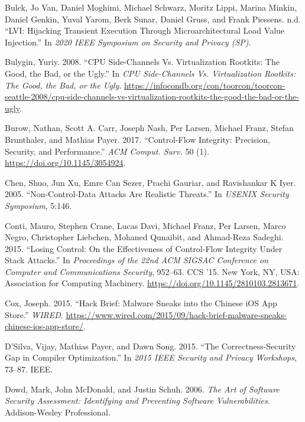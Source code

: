 \documentclass[
  a4paper,
]{report}
\newlength{\cslhangindent}
\newlength{\cslentryspacingunit} %
\newenvironment{CSLReferences}[2] %
 {%
  \setlength{\parindent}{0pt}
  \ifodd #1
  \let\oldpar\par
  \def\par{\hangindent=\cslhangindent\oldpar}
  \fi
  \setlength{\parskip}{#2\cslentryspacingunit}
 }%
 {}
\begin{document}
\begin{CSLReferences}{1}{0}
\leavevmode{}%
Bulck, Jo Van, Daniel Moghimi, Michael Schwarz, Moritz Lippi, Marina
Minkin, Daniel Genkin, Yuval Yarom, Berk Sunar, Daniel Gruss, and Frank
Piessens. n.d. {``{LVI}: Hijacking Transient Execution Through
Microarchitectural Load Value Injection.''} In \emph{2020 {IEEE}
Symposium on Security and Privacy ({SP})}.

\leavevmode{}%
Bulygin, Yuriy. 2008. {``{CPU} Side-Channels Vs. Virtualization
Rootkits: The Good, the Bad, or the Ugly.''} In \emph{CPU Side-Channels
Vs. Virtualization Rootkits: The Good, the Bad, or the Ugly}.
\url{https://infocondb.org/con/toorcon/toorcon-seattle-2008/cpu-side-channels-vs-virtualization-rootkits-the-good-the-bad-or-the-ugly}.

\leavevmode{}%
Burow, Nathan, Scott A. Carr, Joseph Nash, Per Larsen, Michael Franz,
Stefan Brunthaler, and Mathias Payer. 2017. {``Control-Flow Integrity:
Precision, Security, and Performance.''} \emph{ACM Comput. Surv.} 50
(1). \url{https://doi.org/10.1145/3054924}.

\leavevmode{}%
Chen, Shuo, Jun Xu, Emre Can Sezer, Prachi Gauriar, and Ravishankar K
Iyer. 2005. {``Non-Control-Data Attacks Are Realistic Threats.''} In
\emph{USENIX Security Symposium}, 5:146.

\leavevmode{}%
Conti, Mauro, Stephen Crane, Lucas Davi, Michael Franz, Per Larsen,
Marco Negro, Christopher Liebchen, Mohaned Qunaibit, and Ahmad-Reza
Sadeghi. 2015. {``Losing Control: On the Effectiveness of Control-Flow
Integrity Under Stack Attacks.''} In \emph{Proceedings of the 22nd ACM
SIGSAC Conference on Computer and Communications Security}, 952--63. CCS
'15. New York, NY, USA: Association for Computing Machinery.
\url{https://doi.org/10.1145/2810103.2813671}.

\leavevmode{}%
Cox, Joseph. 2015. {``Hack Brief: Malware Sneaks into the Chinese iOS
App Store.''} \emph{WIRED}.
\url{https://www.wired.com/2015/09/hack-brief-malware-sneaks-chinese-ios-app-store/}.

\leavevmode{}%
D'Silva, Vijay, Mathias Payer, and Dawn Song. 2015. {``The
Correctness-Security Gap in Compiler Optimization.''} In \emph{2015 IEEE
Security and Privacy Workshops}, 73--87. IEEE.

\leavevmode{}%
Dowd, Mark, John McDonald, and Justin Schuh. 2006. \emph{The Art of
Software Security Assessment: Identifying and Preventing Software
Vulnerabilities}. Addison-Wesley Professional.


\end{CSLReferences}
\end{document}
